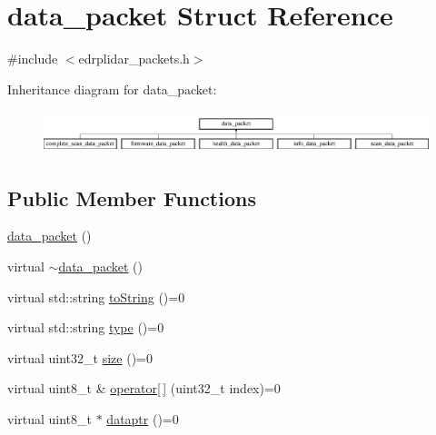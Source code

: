 \hypertarget{structdata__packet}{\section{data\-\_\-packet Struct Reference}
\label{structdata__packet}
}


{\ttfamily \#include $<$edrplidar\-\_\-packets.\-h$>$}

Inheritance diagram for data\-\_\-packet\-:\begin{figure}[H]
\begin{center}
\leavevmode
\includegraphics[height=1.251397cm]{structdata__packet}
\end{center}
\end{figure}
\subsection*{Public Member Functions}
\begin{DoxyCompactItemize}
\item 
\hyperlink{structdata__packet_aeac45f0ad8cb14657bd37306170b2afd}{data\-\_\-packet} ()
\item 
virtual \hyperlink{structdata__packet_a63fd3fc8f94d6bd4fb3accfe612cfe3b}{$\sim$data\-\_\-packet} ()
\item 
virtual std\-::string \hyperlink{structdata__packet_ad7ce179caef76c895bfc778862bc15ac}{to\-String} ()=0
\item 
virtual std\-::string \hyperlink{structdata__packet_af0795581f2d57a8c14a88009da37aee1}{type} ()=0
\item 
virtual uint32\-\_\-t \hyperlink{structdata__packet_ab5c9259a79cde0dc60d75135fe8464f6}{size} ()=0
\item 
virtual uint8\-\_\-t \& \hyperlink{structdata__packet_a8f0d95d4a7a7089b45cef14e45b0c21b}{operator\mbox{[}$\,$\mbox{]}} (uint32\-\_\-t index)=0
\item 
virtual uint8\-\_\-t $\ast$ \hyperlink{structdata__packet_ac53dcca572fc7cf7d71ae21d5c785365}{dataptr} ()=0
\end{DoxyCompactItemize}


